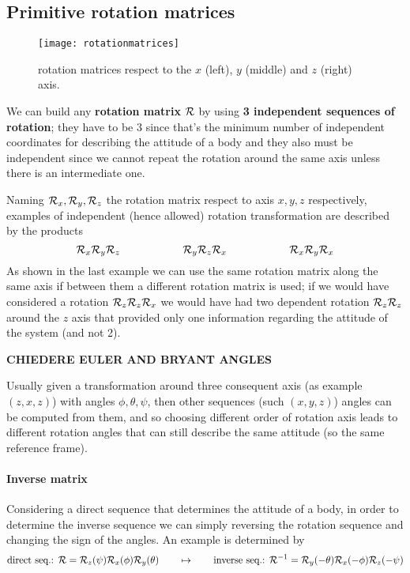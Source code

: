 	\subsection{Primitive rotation matrices}
		
		\begin{figure}[bt]
			\centering \texttt{[image: rotationmatrices]}
			\caption{rotation matrices respect to the $x$ (left), $y$ (middle) and $z$ (right) axis.}
		\end{figure}
		
		We can build any \textbf{rotation matrix} $\mathcal R$ by using \textbf{3 independent sequences of rotation}; they have to be 3 since that's the minimum number of independent coordinates for describing the attitude of a body and they also must be independent since we cannot repeat the rotation around the same axis unless there is an intermediate one.
		
		Naming $\mathcal R_x,\mathcal R_y,\mathcal R_z$ the rotation matrix respect to axis $x,y,z$ respectively, examples of independent (hence allowed) rotation transformation are described by the products
		\[ \mathcal R_x \mathcal R_y \mathcal R_z \hspace{2cm} \mathcal R_y \mathcal R_z \mathcal R_x \hspace{2cm} \mathcal R_x \mathcal R_y \mathcal R_x \]
		As shown in the last example we can use the same rotation matrix along the same axis if between them a different rotation matrix is used; if we would have considered a rotation $\mathcal R_z \mathcal R_z \mathcal R_x$ we would have had two dependent rotation $\mathcal R_z\mathcal R_z$ around the $z$ axis that provided only one information regarding the attitude of the system (and not 2).
	 
	 	\textbf{CHIEDERE EULER AND BRYANT ANGLES}
	 	
	 	Usually given a transformation around three consequent axis (as example $(z,x,z)$) with angles $\phi,\theta,\psi$, then other sequences (such $(x,y,z)$) angles can be computed from them, and so choosing different order of rotation axis leads to different rotation angles that can still describe the same attitude (so the same reference frame).
	 	
	 	\paragraph{Inverse matrix} Considering a direct sequence that determines the attitude of a body, in order to determine the inverse sequence we can simply reversing the rotation sequence and changing the sign of the angles. An example is determined by
	 	\[ \textrm{direct seq.: } \mathcal R = \mathcal R_z(\psi) \mathcal R_x(\phi)\mathcal R_y(\theta) \qquad \mapsto \qquad \textrm{inverse seq.: } \mathcal R^{-1} = \mathcal R_y(-\theta) \mathcal R_x(-\phi) \mathcal R_z(-\psi) \]
		
